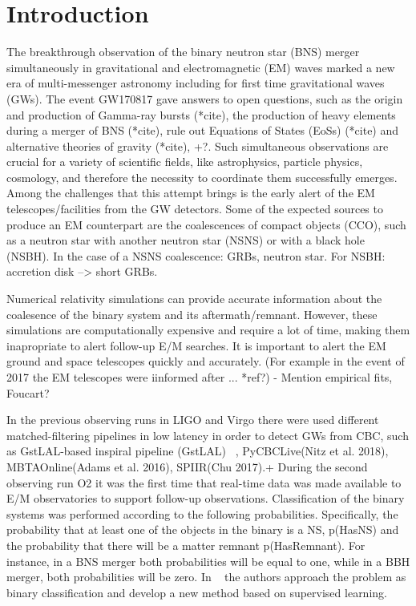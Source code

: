 \section{Introduction}


The breakthrough observation of the binary neutron star (BNS) merger simultaneously in gravitational and electromagnetic (EM) waves \cite{LIGOScientific:2017ync} marked a new era of multi-messenger astronomy including for first time gravitational waves (GWs). The event GW170817 gave answers to open questions, such as the origin and production of Gamma-ray bursts (*cite), the production of heavy elements during a merger of BNS (*cite), rule out Equations of States (EoSs) (*cite) and alternative theories of gravity (*cite), +?. Such simultaneous observations are crucial for a variety of scientific fields, like astrophysics, particle physics, cosmology, and therefore the necessity to coordinate them successfully emerges. Among the challenges that this attempt brings is the early alert of the EM telescopes/facilities from the GW detectors. Some of the expected sources to produce an EM counterpart are the coalescences of compact objects (CCO), such as a neutron star with another neutron star (NSNS) or with a black hole (NSBH). In the case of a NSNS coalescence: GRBs, neutron star. For NSBH: accretion disk --> short GRBs.

Numerical relativity simulations can provide accurate information about the coalesence of the binary system and its aftermath/remnant. However, these simulations are computationally expensive and require a lot of time, making them inapropriate to alert follow-up E/M searches. It is important to alert the EM ground and space telescopes quickly and accurately. (For example in the event of 2017 the EM telescopes were iinformed after ... *ref?)
- Mention empirical fits, Foucart?

 
In the previous observing runs in LIGO and Virgo there were used different matched-filtering pipelines in low latency in order to detect GWs from CBC, such as GstLAL-based inspiral pipeline (GstLAL) ~\cite{Sachdev:2020lfd}, PyCBCLive(Nitz et al. 2018), MBTAOnline(Adams et al. 2016), SPIIR(Chu 2017).+ During the second observing run O2 it was the first time that real-time data was made available to E/M observatories to support follow-up observations. Classification of the binary systems was performed according to the following probabilities. Specifically, the probability that at least one of the objects in the binary is a NS, p(HasNS) and the probability that there will be a matter remnant p(HasRemnant). For instance, in a BNS merger both probabilities will be equal to one, while in a BBH merger, both probabilities will be zero. In ~\cite{Chatterjee:2019avs} the authors approach the problem as binary classification and develop a new method based on supervised learning.


